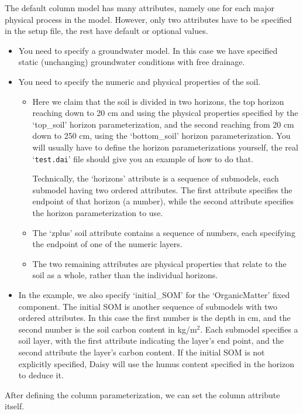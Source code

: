 The default column model has many attributes, namely one for each
major physical process in the model.  However, only two attributes
have to be specified in the setup file, the rest have default or
optional values.
\begin{itemize}
\item You need to specify a groundwater model.  In this case we have
  specified static (unchanging) groundwater conditions with free
  drainage.
\item You need to specify the numeric and physical properties of the
  soil.  
  \begin{itemize}
  \item Here we claim that the soil is divided in two horizons, the
    top horizon reaching down to 20 cm and using the physical
    properties specified by the `top\_soil' horizon parameterization,
    and the second reaching from 20 cm down to 250 cm, using the
    `bottom\_soil' horizon parameterization.  You will usually have to
    define the horizon parameterizations yourself, the real
    `\texttt{test.dai}' file should give you an example of how to do
    that.
    
    Technically, the `horizons' attribute is a sequence of submodels,
    each submodel having two ordered attributes.  The first attribute
    specifies the endpoint of that horizon (a number), while the second
    attribute specifies the horizon parameterization to use.
  \item The `zplus' soil attribute contains a sequence of numbers,
    each specifying the endpoint of one of the numeric layers.
  \item The two remaining attributes are physical properties that
    relate to the soil as a whole, rather than the individual
    horizons.
  \end{itemize}  
\item In the example, we also specify `initial\_SOM' for the
  `OrganicMatter' fixed component.  The initial SOM is another
  sequence of submodels with two ordered attributes.  In this case the
  first number is the depth in cm, and the second number is the soil
  carbon content in kg/$\mbox{m}^2$.  Each submodel specifies a soil
  layer, with the first attribute indicating the layer's end point, and
  the second attribute the layer's carbon content.  If the initial SOM
  is not explicitly specified, Daisy will use the humus content
  specified in the horizon to deduce it.
\end{itemize}

After defining the column parameterization, we can set the column
attribute itself.

